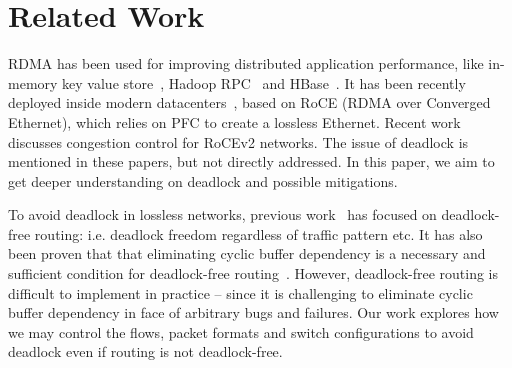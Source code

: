 \section{Related Work}

 RDMA has been used for improving distributed
application performance, like in-memory key value store~\cite{mitchell13atc,
farm, kalia14sigcomm}, Hadoop RPC~\cite{hadooprdma} and HBase~\cite{hbaserdma}.
It has been recently deployed inside modern
datacenters~\cite{timely,dcqcn,rdmascale}, based on RoCE (RDMA over Converged
Ethernet), which relies on PFC to create a lossless Ethernet.  Recent
work~\cite{timely,dcqcn} discusses congestion control for RoCEv2
networks. The issue of deadlock is mentioned in these papers, but not directly
addressed. In this paper, we aim to get deeper understanding on deadlock and
possible mitigations.

 To avoid deadlock in lossless networks, previous
work~\cite{tcpbolt,karol2003prevention,lash,sancho2004,wu2003fault} has focused
on deadlock-free routing: i.e. deadlock freedom regardless of traffic pattern
etc. It has also been proven that that eliminating cyclic buffer dependency is a
necessary and sufficient condition for deadlock-free
routing~\cite{deadlockfree}. However, deadlock-free routing is difficult to
implement in practice -- since it is challenging to eliminate cyclic buffer
dependency in face of arbitrary bugs and failures. Our work explores how we may
control the flows, packet formats and switch configurations to avoid deadlock
even if routing is not deadlock-free.






